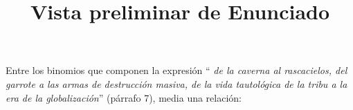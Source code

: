 \documentclass[a4paper,12pt]{article}\usepackage[utf8]{inputenc}\usepackage[spanish]{babel}\usepackage{times}
\title{Vista preliminar de Enunciado}
\begin{document}
\twocolumn 

\maketitle

Entre los binomios que componen la expresión  “\textit{ de la caverna al rascacielos, del garrote a las armas de destrucción masiva, de la vida tautológica de la tribu a la era de la globalización}” (párrafo 7), media una relación:
\end{document}
